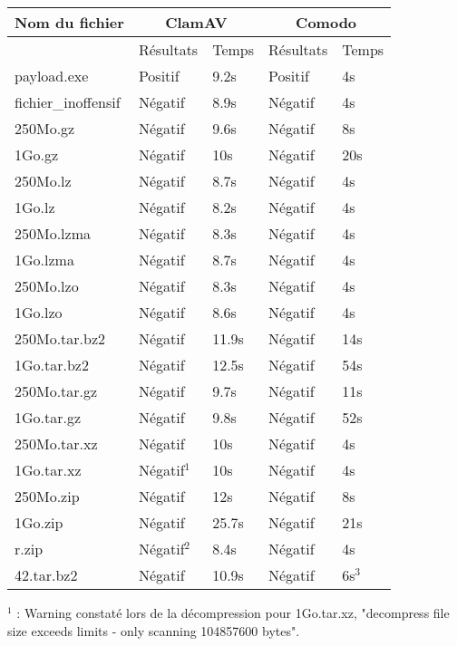 \documentclass[smallextended]{svjour3}       %
\begin{document}
\begin{tabular}{|l|l|l|l|l|}
  \hline
  \textbf{Nom du fichier} & \multicolumn{2}{|c|}{\textbf{ClamAV}} & \multicolumn{2}{|c|}{\textbf{Comodo}}\\
  \hline
   & Résultats & Temps & Résultats & Temps \\
  \hline
  \hline
payload.exe & Positif & 9.2s & Positif & 4s\\
	\hline
fichier\_inoffensif & Négatif & 8.9s & Négatif & 4s\\
	\hline
	\hline
250Mo.gz &  Négatif  & 9.6s & Négatif & 8s\\
	\hline
1Go.gz &  Négatif  & 10s & Négatif & 20s\\
    \hline
    \hline
250Mo.lz &  Négatif  & 8.7s & Négatif & 4s\\
	\hline
1Go.lz &  Négatif & 8.2s & Négatif & 4s\\
    \hline
    \hline
250Mo.lzma &  Négatif  &  8.3s & Négatif & 4s\\
	\hline
1Go.lzma &  Négatif  & 8.7s & Négatif & 4s\\
    \hline
    \hline
250Mo.lzo &   Négatif & 8.3s & Négatif & 4s\\
	\hline
1Go.lzo &  Négatif  & 8.6s & Négatif & 4s\\
    \hline
    \hline
250Mo.tar.bz2 &  Négatif & 11.9s & Négatif & 14s\\
	\hline
1Go.tar.bz2 &  Négatif  &  12.5s & Négatif & 54s\\
    \hline
    \hline
250Mo.tar.gz &   Négatif & 9.7s & Négatif & 11s\\
	\hline
1Go.tar.gz &  Négatif  & 9.8s & Négatif & 52s\\
    \hline
    \hline
250Mo.tar.xz &  Négatif  & 10s & Négatif & 4s\\
	\hline
1Go.tar.xz &  Négatif$^1$  &  10s & Négatif & 4s\\
    \hline
    \hline
250Mo.zip &   Négatif & 12s & Négatif & 8s\\
	\hline
1Go.zip &   Négatif & 25.7s & Négatif & 21s\\
    \hline
    \hline
r.zip & Négatif$^2$ & 8.4s & Négatif & 4s\\
	\hline
42.tar.bz2 & Négatif  & 10.9s & Négatif & 6s$^3$\\
	\hline
\end{tabular}
$ $\\
$^1$ : Warning constaté lors de la décompression pour 1Go.tar.xz, "decompress file size exceeds limits - only scanning 104857600 bytes".\\
\end{document}
